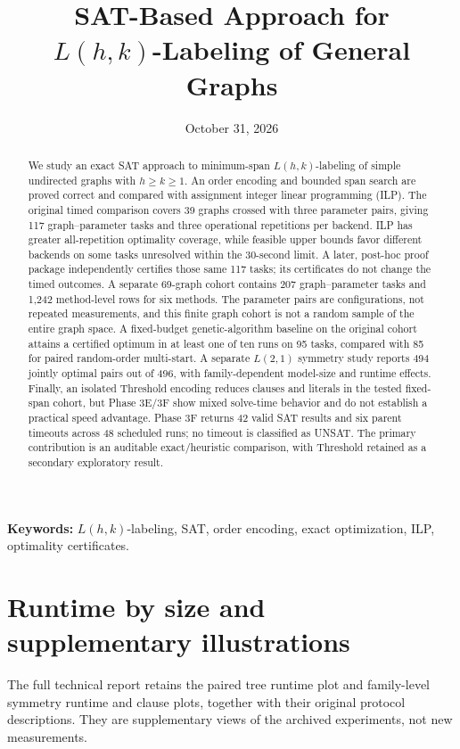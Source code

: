 \documentclass[11pt,a4paper]{article}
\title{SAT-Based Approach for\\$L(h,k)$-Labeling of General Graphs}
\author{}
\date{October 31, 2026}
\begin{document}
\maketitle
\begin{abstract}
We study an exact SAT approach to minimum-span $L(h,k)$-labeling of
simple undirected graphs with $h\geq k\geq1$. An order encoding and
bounded span search are proved correct and compared with assignment
integer linear programming (ILP). The original timed comparison covers
39 graphs crossed with three parameter pairs, giving 117
graph--parameter tasks and three operational repetitions per backend.
ILP has greater all-repetition optimality coverage, while feasible upper
bounds favor different backends on some tasks unresolved within the
30-second limit. A later, post-hoc proof package independently certifies
those same 117 tasks; its certificates do not change the timed outcomes.
A separate 69-graph cohort contains 207 graph--parameter tasks and 1,242
method-level rows for six methods. The parameter pairs are configurations,
not repeated measurements, and this finite graph cohort is not a random
sample of the entire graph space.
A fixed-budget genetic-algorithm baseline on the original cohort attains
a certified optimum in at least one of ten runs on 95 tasks, compared
with 85 for paired random-order multi-start. A separate $L(2,1)$ symmetry
study reports 494 jointly optimal pairs out of 496, with family-dependent
model-size and runtime effects.
Finally, an isolated Threshold encoding reduces clauses and literals in
the tested fixed-span cohort, but Phase 3E/3F show mixed solve-time
behavior and do not establish a practical speed advantage. Phase 3F
returns 42 valid SAT results and six parent timeouts across 48 scheduled
runs; no timeout is classified as UNSAT. The primary contribution is an
auditable exact/heuristic comparison, with Threshold retained as a
secondary exploratory result.
\end{abstract}
\noindent\textbf{Keywords:} $L(h,k)$-labeling, SAT, order encoding,
exact optimization, ILP, optimality certificates.








\begingroup
\small


\endgroup
\clearpage
\appendix

\section{Runtime by size and supplementary illustrations}
\label{sec:submission-size-summary}

The full technical report retains the paired tree runtime plot and
family-level symmetry runtime and clause plots, together with their
original protocol descriptions. They are supplementary views of the
archived experiments, not new measurements.
\clearpage




\end{document}
